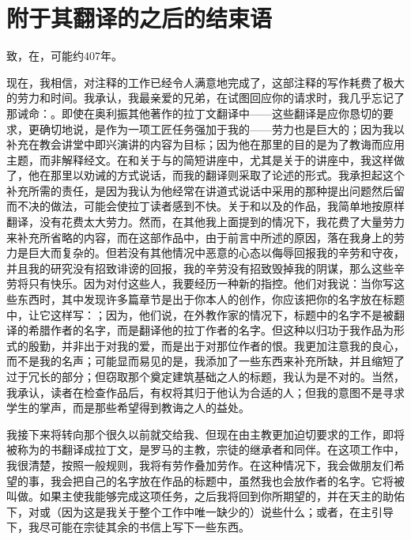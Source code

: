 
\section{附于其翻译的之后的结束语}

致，在，可能约407年。\par

现在，我相信，对注释的工作已经令人满意地完成了，这部注释的写作耗费了极大的劳力和时间。我承认，我最亲爱的兄弟，在试图回应你的请求时，我几乎忘记了那诫命：。即使在奥利振其他著作的拉丁文翻译中——这些翻译是应你恳切的要求，更确切地说，是作为一项工匠任务强加于我的——劳力也是巨大的；因为我以补充在教会讲堂中即兴演讲的内容为目标；因为他在那里的目的是为了教诲而应用主题，而非解释经文。在和关于与的简短讲座中，尤其是关于的讲座中，我这样做了，他在那里以劝诫的方式说话，而我的翻译则采取了论述的形式。我承担起这个补充所需的责任，是因为我认为他经常在讲道式说话中采用的那种提出问题然后留而不决的做法，可能会使拉丁读者感到不快。关于和以及的作品，我简单地按原样翻译，没有花费太大劳力。然而，在其他我上面提到的情况下，我花费了大量劳力来补充所省略的内容，而在这部作品中，由于前言中所述的原因，落在我身上的劳力是巨大而复杂的。但若没有其他情况中恶意的心态以侮辱回报我的辛劳和守夜，并且我的研究没有招致诽谤的回报，我的辛劳没有招致毁掉我的阴谋，那么这些辛劳将只有快乐。因为对付这些人，我要经历一种新的指控。他们对我说：当你写这些东西时，其中发现许多篇章节是出于你本人的创作，你应该把你的名字放在标题中，让它这样写：；因为，他们说，在外教作家的情况下，标题中的名字不是被翻译的希腊作者的名字，而是翻译他的拉丁作者的名字。但这种以归功于我作品为形式的殷勤，并非出于对我的爱，而是出于对那位作者的恨。我更加注意我的良心，而不是我的名声；可能显而易见的是，我添加了一些东西来补充所缺，并且缩短了过于冗长的部分；但窃取那个奠定建筑基础之人的标题，我认为是不对的。当然，我承认，读者在检查作品后，有权将其归于他认为合适的人；但我的意图不是寻求学生的掌声，而是那些希望得到教诲之人的益处。\par

我接下来将转向那个很久以前就交给我、但现在由主教更加迫切要求的工作，即将被称为的书翻译成拉丁文，是罗马的主教，宗徒的继承者和同伴。在这项工作中，我很清楚，按照一般规则，我将有劳作叠加劳作。在这种情况下，我会做朋友们希望的事，我会把自己的名字放在作品的标题中，虽然我也会放作者的名字。它将被叫做。如果主使我能够完成这项任务，之后我将回到你所期望的，并在天主的助佑下，对或（因为这是我关于整个工作中唯一缺少的）说些什么；或者，在主引导下，我尽可能在宗徒其余的书信上写下一些东西。\par

